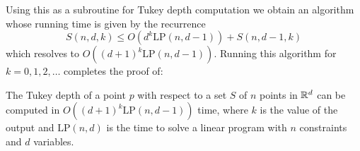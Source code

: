 \documentclass[charterfonts,lotsofwhite]{patmorin}
\newcommand{\lp}{\mathrm{LP}}
\begin{document}
Using this as a subroutine for Tukey depth computation we obtain an
algorithm whose running time is given by the recurrence
\[
    S(n,d,k) \le O(d^k\lp(n,d-1)) + S(n,d-1,k)
\]
which resolves to $O((d+1)^k\lp(n,d-1))$.  Running this algorithm for
$k=0,1,2,\ldots$ completes the proof of:

\begin{thm}
The Tukey depth of a point $p$ with respect to a set $S$ of $n$ points
in $\mathbb{R}^d$ can be computed in $O((d+1)^k\lp(n,d-1))$ time, where $k$ is
the value of the output and $\lp(n,d)$ is the time to solve a linear
program with $n$ constraints and $d$ variables.
\end{thm}



\end{document}
